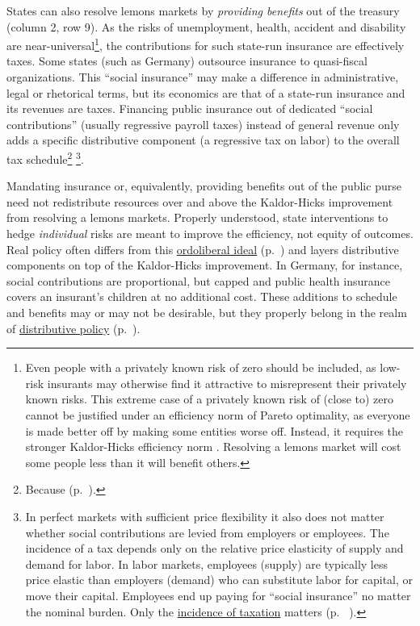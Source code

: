 States can also resolve lemons markets by \emph{providing benefits} out of the treasury (column 2, row 9). As the risks of unemployment, health, accident and disability are near-universal\footnote{
	Even people with a privately known risk of zero should be included, as low-risk insurants may otherwise find it attractive to misrepresent their privately known risks. This extreme case of a privately known risk of (close to) zero cannot be justified under an efficiency norm of Pareto optimality, as everyone is made better off by making some entities worse off. Instead, it requires the stronger Kaldor-Hicks efficiency norm \citep{Kaldor1939,Hicks1939}. Resolving a lemons market will cost some people less than it will benefit others.},
the contributions for such state-run insurance are effectively taxes. Some states (such as Germany) outsource insurance to quasi-fiscal organizations. This ``social insurance'' may make a difference in administrative, legal or rhetorical terms, but its economics are that of a state-run insurance and its revenues are taxes. Financing public insurance out of dedicated ``social contributions'' (usually regressive payroll taxes) instead of general revenue only adds a specific distributive component (a regressive tax on labor) to the overall tax schedule\footnote{
	Because  (p.~\pageref{sec:redistribution-and-revenue-are-one}).}
\footnote{
	In perfect markets with sufficient price flexibility it also does not matter whether social contributions are levied from employers or employees. The incidence of a tax depends only on the relative price elasticity of supply and demand for labor. In labor markets, employees (supply) are typically less price elastic than employers (demand) who can substitute labor for capital, or move their capital. Employees end up paying for ``social insurance'' no matter the nominal burden. Only the \hyperref[sec:well-determined-incidence]{incidence of taxation} matters (p.~ \pageref{sec:well-determinedincidence}).}.

Mandating insurance or, equivalently, providing benefits out of the public purse need not redistribute resources over and above the Kaldor-Hicks improvement from resolving a lemons markets. Properly understood, state interventions to hedge \emph{individual} risks are meant to improve the efficiency, not equity of outcomes. Real policy often differs from this \hyperref[sec:ordoliberalhygiene]{ordoliberal ideal} (p.~\pageref{sec:ordoliberalhygiene}) and layers distributive components on top of the Kaldor-Hicks improvement. In Germany, for instance, social contributions are proportional, but capped and public health insurance covers an insurant's children at no additional cost. These additions to schedule and benefits may or may not be desirable, but they properly belong in the realm of \hyperref[sec:distribution]{distributive policy} (p.~\pageref{sec:distribution}).

